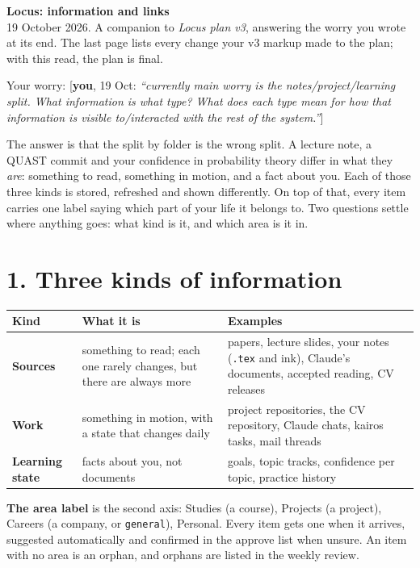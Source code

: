 \documentclass[10pt]{extarticle}
\newcommand{\you}[2]{{\small[\textbf{you}, #1: \textit{``#2''}]}}
\newcommand{\Sec}[1]{\section*{#1}}
\begin{document}
{\Large\bfseries Locus: information and links}\\[0.3em]
{\small 19 October 2026. A companion to \textit{Locus plan v3}, answering the worry you wrote at its end. The last page lists every change your v3 markup made to the plan; with this read, the plan is final.}

\medskip
Your worry: \you{19 Oct}{currently main worry is the notes/project/learning split. What information is what type? What does each type mean for how that information is visible to/interacted with the rest of the system.}

The answer is that the split by folder is the wrong split. A lecture note, a QUAST commit and your confidence in probability theory differ in what they \emph{are}: something to read, something in motion, and a fact about you. Each of those three kinds is stored, refreshed and shown differently. On top of that, every item carries one label saying which part of your life it belongs to. Two questions settle where anything goes: what kind is it, and which area is it in.

\Sec{1. Three kinds of information}

\begin{tabularx}{\linewidth}{@{}l Y Y@{}}
\toprule
Kind & What it is & Examples \\
\midrule
\textbf{Sources} & something to read; each one rarely changes, but there are always more & papers, lecture slides, your notes (\texttt{.tex} and ink), Claude's documents, accepted reading, CV releases \\
\textbf{Work} & something in motion, with a state that changes daily & project repositories, the CV repository, Claude chats, kairos tasks, mail threads \\
\textbf{Learning state} & facts about you, not documents & goals, topic tracks, confidence per topic, practice history \\
\bottomrule
\end{tabularx}

\medskip
\textbf{The area label} is the second axis: Studies (a course), Projects (a project), Careers (a company, or \texttt{general}), Personal. Every item gets one when it arrives, suggested automatically and confirmed in the approve list when unsure. An item with no area is an orphan, and orphans are listed in the weekly review.
\end{document}
